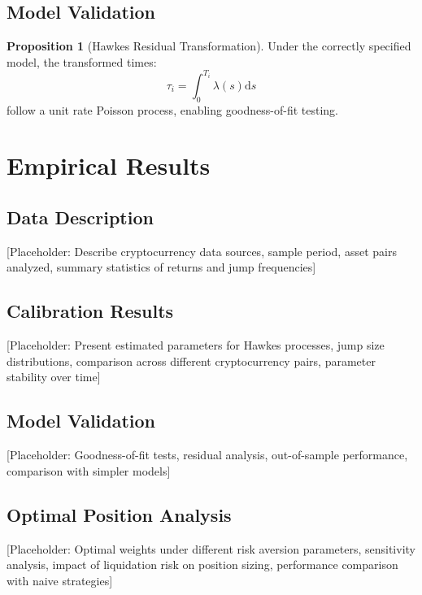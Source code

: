 \documentclass{article}
\newcommand{\diff}{\mathrm{d}}
\theoremstyle{definition}
\newtheorem{proposition}{Proposition}[section]
\begin{document}
\subsection{Model Validation}

\begin{proposition}[Hawkes Residual Transformation]
\label{prop:residuals}
Under the correctly specified model, the transformed times:
\begin{equation}
\tau_i = \int_0^{T_i} \lambda(s) \diff s
\end{equation}
follow a unit rate Poisson process, enabling goodness-of-fit testing.
\end{proposition}

\section{Empirical Results}

\subsection{Data Description}

[Placeholder: Describe cryptocurrency data sources, sample period, asset pairs analyzed, summary statistics of returns and jump frequencies]

\subsection{Calibration Results}

[Placeholder: Present estimated parameters for Hawkes processes, jump size distributions, comparison across different cryptocurrency pairs, parameter stability over time]

\subsection{Model Validation}

[Placeholder: Goodness-of-fit tests, residual analysis, out-of-sample performance, comparison with simpler models]

\subsection{Optimal Position Analysis}

[Placeholder: Optimal weights under different risk aversion parameters, sensitivity analysis, impact of liquidation risk on position sizing, performance comparison with naive strategies]
\end{document}
